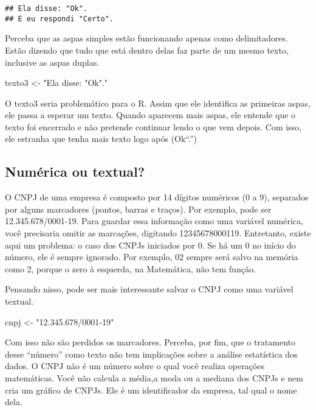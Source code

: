 \documentclass[
]{book}
\newenvironment{Shaded}{\begin{snugshade}}{\end{snugshade}}
\newcommand{\NormalTok}[1]{#1}
\newcommand{\StringTok}[1]{\textcolor[rgb]{0.31,0.60,0.02}{#1}}
\begin{document}
\begin{verbatim}
## Ela disse: "Ok".
## E eu respondi "Certo".
\end{verbatim}

Perceba que as aspas simples estão funcionando apenas como delimitadores. Estão dizendo que tudo que está dentro delas faz parte de um mesmo texto, inclusive as aspas duplas.

\begin{Shaded}
\begin{Highlighting}[]
\NormalTok{texto3 <-}\StringTok{ "Ela disse: "}\NormalTok{Ok}\StringTok{"."}
\end{Highlighting}
\end{Shaded}

O texto3 seria problemático para o R. Assim que ele identifica as primeiras aspas, ele passa a esperar um texto. Quando aparecem mais aspas, ele entende que o texto foi encerrado e não pretende continuar lendo o que vem depois. Com isso, ele estranha que tenha mais texto logo após (Ok``.'')

\hypertarget{numuxe9rica-ou-textual}{%
\subsection{Numérica ou textual?}\label{numuxe9rica-ou-textual}}

O CNPJ de uma empresa é composto por 14 dígitos numéricos (0 a 9), separados por alguns marcadores (pontos, barras e traços). Por exemplo, pode ser 12.345.678/0001-19. Para guardar essa informação como uma variável numérica, você precisaria omitir as marcações, digitando 12345678000119. Entretanto, existe aqui um problema: o caso dos CNPJs iniciados por 0. Se há um 0 no início do número, ele é sempre ignorado. Por exemplo, 02 sempre será salvo na memória como 2, porque o zero à esquerda, na Matemática, não tem função.

Pensando nisso, pode ser mais interessante salvar o CNPJ como uma variável textual.

\begin{Shaded}
\begin{Highlighting}[]
\NormalTok{cnpj <-}\StringTok{ "12.345.678/0001-19"}
\end{Highlighting}
\end{Shaded}

Com isso não são perdidos os marcadores. Perceba, por fim, que o tratamento desse ``número'' como texto não tem implicações sobre a análise estatística dos dados. O CNPJ não é um número sobre o qual você realiza operações matemáticas. Você não calcula a média,a moda ou a mediana dos CNPJs e nem cria um gráfico de CNPJs. Ele é um identificador da empresa, tal qual o nome dela.
\end{document}
